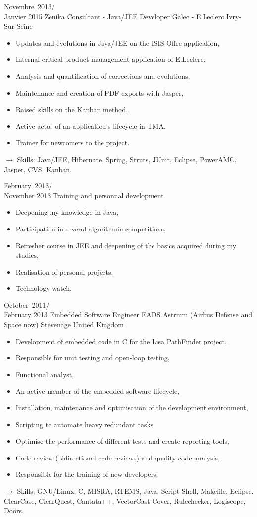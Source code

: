 \documentclass[11pt,a4paper]{moderncv}
\begin{document}
\cventry
{Novembre\ 2013/\\Janvier 2015}
{Zenika Consultant - Java/JEE Developer}
{Galec - E.Leclerc}
{Ivry-Sur-Seine}
{}
{\begin{itemize}
\item Updates and evolutions in Java/JEE on the ISIS-Offre application,
\item Internal critical product management application of E.Leclerc,
\item Analysis and quantification of corrections and evolutions,
\item Maintenance and creation of PDF exports with Jasper,
\item Raised skills on the Kanban method,
\item Active actor of an application's lifecycle in TMA,
\item Trainer for newcomers to the project.
\end{itemize}
$\rightarrow$ Skills: Java/JEE, Hibernate, Spring, Struts, JUnit, Eclipse, PowerAMC, Jasper, CVS, Kanban.
}   %

\cventry
{February\ 2013/\\November 2013}
{Training and personnal development}{}{}{}
{\begin{itemize}
\item Deepening my knowledge in Java,
\item Participation in several algorithmic competitions,
\item Refresher course in JEE and deepening of the basics acquired during my studies,
\item Realisation of personal projects,
\item Technology watch.
\end{itemize}
}   %

\cventry
{October\ 2011/\\February 2013}
{Embedded Software Engineer}
{EADS Astrium (Airbus Defense and Space now)}
{Stevenage United Kingdom}
{}
{\begin{itemize}
\item Development of embedded code in C for the Lisa PathFinder project,
\item Responsible for unit testing and open-loop testing,
\item Functional analyst,
\item An active member of the embedded software lifecycle,
\item Installation, maintenance and optimisation of the development environment,
\item Scripting to automate heavy redundant tasks,
\item Optimise the performance of different tests and create reporting tools,
\item Code review (bidirectional code reviews) and quality code analysis,
\item Responsible for the training of new developers.
\end{itemize}
$\rightarrow$ Skills: GNU/Linux, C, MISRA, RTEMS, Java, Script Shell, Makefile, Eclipse, ClearCase, ClearQuest, Cantata++, VectorCast Cover, Rulechecker, Logiscope, Doors.
}   %
\end{document}
